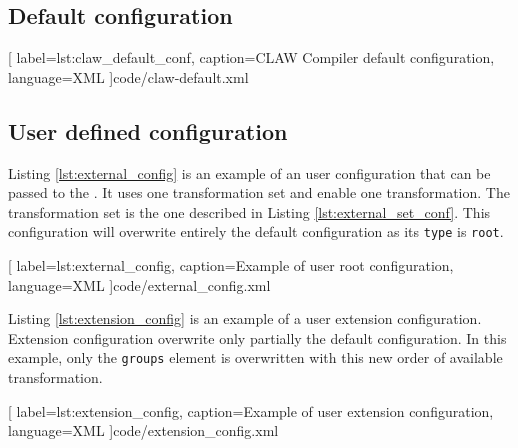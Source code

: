 \subsection{Default configuration}

  [
    label=lst:claw_default_conf,
    caption=CLAW Compiler default configuration,
    language=XML
  ]{code/claw-default.xml}

\subsection{User defined configuration}
Listing \ref{lst:external_config} is an example of an user configuration that
can be passed to the \clawfcomp. It uses one transformation set and enable
one transformation. The transformation set is the one described in Listing
\ref{lst:external_set_conf}. This configuration will overwrite entirely the
default configuration as its \lstinline!type! is \lstinline!root!.


  [
    label=lst:external_config,
    caption=Example of user root configuration,
    language=XML
  ]{code/external_config.xml}

Listing \ref{lst:extension_config} is an example of a user extension configuration.
Extension configuration overwrite only partially the default configuration. In this
example, only the \lstinline!groups! element is overwritten with this new order of
available transformation.


  [
    label=lst:extension_config,
    caption=Example of user extension configuration,
    language=XML
  ]{code/extension_config.xml}
